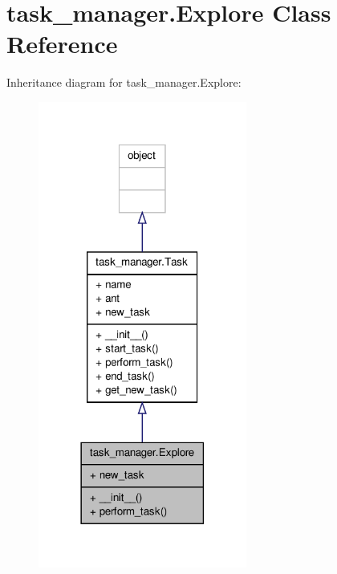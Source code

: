 \hypertarget{classtask__manager_1_1Explore}{\section{task\+\_\+manager.\+Explore Class Reference}
\label{classtask__manager_1_1Explore}
}


Inheritance diagram for task\+\_\+manager.\+Explore\+:
\nopagebreak
\begin{figure}[H]
\begin{center}
\leavevmode
\includegraphics[width=194pt]{classtask__manager_1_1Explore__inherit__graph}
\end{center}
\end{figure}


